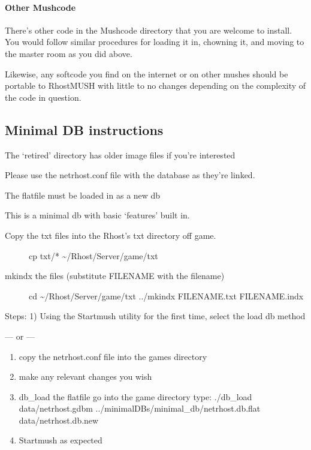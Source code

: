 \documentclass[letterpaper,10pt,english]{sphinxmanual}
\begin{document}
\paragraph{Other Mushcode}
\label{\detokenize{gettingstarted:other-mushcode}}
\sphinxAtStartPar
There’s other code in the Mushcode directory that you are welcome to install.  You would follow similar procedures
for loading it in, chowning it, and moving to the master room as you did above.

\sphinxAtStartPar
Likewise, any softcode you find on the internet or on other mushes should be portable to RhostMUSH with little to
no changes depending on the complexity of the code in question.


\subsection{Minimal DB instructions}
\label{\detokenize{gettingstarted:minimal-db-instructions}}
\sphinxAtStartPar
The ‘retired’ directory has older image files if you’re interested

\sphinxAtStartPar
Please use the netrhost.conf file with the database as they’re linked.

\sphinxAtStartPar
The flatfile must be loaded in as a new db

\sphinxAtStartPar
This is a minimal db with basic ‘features’ built in.
\begin{description}
\item[{Copy the txt files into the Rhost’s txt directory off game.}] \leavevmode
\sphinxAtStartPar
cp txt/* \textasciitilde{}/Rhost/Server/game/txt

\item[{mkindx the files (substitute FILENAME with the filename)}] \leavevmode
\sphinxAtStartPar
cd \textasciitilde{}/Rhost/Server/game/txt
../mkindx FILENAME.txt FILENAME.indx

\end{description}

\sphinxAtStartPar
Steps:
1) Using the Startmush utility for the first time, select the load db method

\sphinxAtStartPar
— or —
\begin{enumerate}
%
\item {} 
\sphinxAtStartPar
copy the netrhost.conf file into the games directory

\item {} 
\sphinxAtStartPar
make any relevant changes you wish

\item {} 
\sphinxAtStartPar
db\_load the flatfile
\sphinxhyphen{} go into the game directory
\sphinxhyphen{} type: ./db\_load data/netrhost.gdbm ../minimal\sphinxhyphen{}DBs/minimal\_db/netrhost.db.flat data/netrhost.db.new

\item {} 
\sphinxAtStartPar
Startmush as expected

\end{enumerate}
\end{document}
